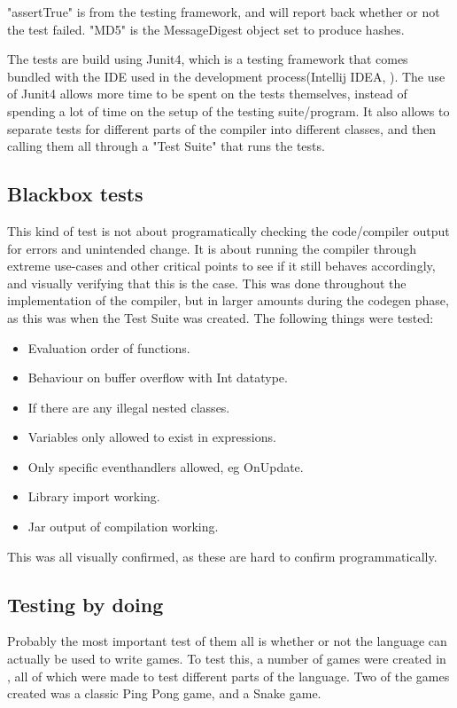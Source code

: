 "assertTrue" is from the testing framework, and will report back whether or not the test failed. "MD5" is the MessageDigest object set to produce hashes.

The tests are build using Junit4, which is a testing framework that comes bundled with the IDE used in the development process(Intellij IDEA, \cite{intellij}). The use of Junit4 allows more time to be spent on the tests themselves, instead of spending a lot of time on the setup of the testing suite/program. It also allows to separate tests for different parts of the compiler into different classes, and then calling them all through a "Test Suite" that runs the tests. 


\subsection{Blackbox tests}
This kind of test is not about programatically checking the code/compiler output for errors and unintended change. It is about running the compiler through extreme use-cases and other critical points to see if it still behaves accordingly, and visually verifying that this is the case. This was done throughout the implementation of the compiler, but in larger amounts during the codegen phase, as this was when the Test Suite was created. The following things were tested:
\begin{itemize}
    \item Evaluation order of functions.
    \item Behaviour on buffer overflow with Int datatype.
    \item If there are any illegal nested classes.
    \item Variables only allowed to exist in expressions.
    \item Only specific eventhandlers allowed, eg OnUpdate.
    \item Library import working.
    \item Jar output of compilation working.
\end{itemize}
This was all visually confirmed, as these are hard to confirm programmatically.

\subsection{Testing by doing}
Probably the most important test of them all is whether or not the language can actually be used to write games. To test this, a number of games were created in \lang{}, all of which were made to test different parts of the language. 
Two of the games created was a classic Ping Pong game, and a Snake game.
